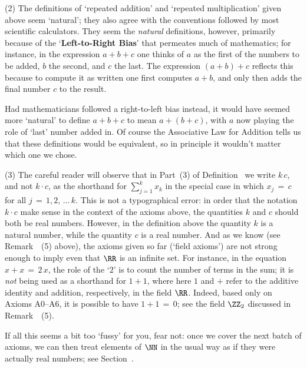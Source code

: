 {\V

        (2) The definitions of `repeated addition' and `repeated multiplication' given above seem `natural';
    they also agree with the conventions followed by most scientific calculators. They seem the {\em natural} definitions, however, primarily because of the
    `{\bf Left-to-Right Bias}' that permeates much of mathematics;
   for instance, in the expression $a+b+c$ one thinks of $a$ as the first of the numbers to be added, $b$  the second, and $c$ the last.
    The expression $(a+b)+c$ reflects this because to compute it as written one first computes $a+b$, and only then adds the final number $c$ to the result.

    Had mathematicians followed a right-to-left bias instead, it would have seemed more `natural' to define $a+b+c$ to mean $a+(b+c)$, with $a$ now playing the role of `last'  number added in.
    Of course the Associative Law for Addition tells us that these definitions would be equivalent, so in principle it wouldn't matter which one we chose.

\V

        (3) The careful reader will observe that in Part~(3) of Definition~ we write $k\,c$, and not $k{\cdot}c$,
    as the shorthand for $\sum_{j=1}^{k} x_{k}$ in the special case in which $x_{j} \,=\, c$ for all $j \,=\, 1,2,\,{\ldots}\,k$.
    This is not a typographical error: in order that the notation $k{\cdot}c$ make sense in the context of the axioms above,
    the quantities $k$ and $c$ should both be real numbers. However, in the definition above the quantity $k$ is a natural number,
    while the quantity $c$ is a real number.
    And as we know (see Remark~~(5) above), the axioms given so far (`field axioms') are not strong enough to imply even that ${\RR}$ is an infinite set.
    For instance, in the equation $x+x \,=\, 2\,x$, the role of the `$2$' is  to count the number of terms in the sum;
    it is {\em not} being used as a shorthand for $1+1$, where here $1$ and $+$ refer to the additive identity and addition, respectively, in the field ${\RR}$.
    Indeed, based only on Axioms A0--A6, it is possible to have $1+1 \,=\, 0$; see the field ${\ZZ}_{2}$ discussed in Remark~~(5).

        If all this seems a bit too `fussy' for you, fear not: once we cover the next batch of axioms,
    we can then treat elements of ${\NN}$ in the usual way as if they were actually real numbers; see Section~.

}
